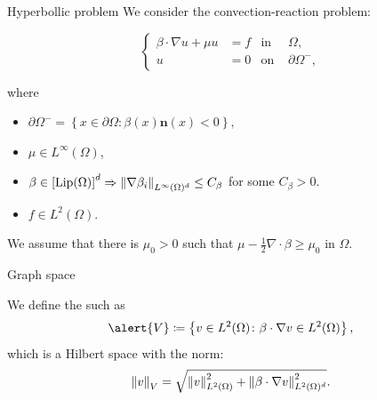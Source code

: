 \begin{frame}{Hyperbollic problem}
	We consider the convection-reaction problem:
	\begin{block}{}
	\begin{equation*}
	\left\{
	\begin{aligned}
	\beta\cdot\nabla u+\mu u&=f & \text{in } &\Omega, \\
	u&=0 & \text{on } &\partial\Omega^-,
	\end{aligned}
	\right.
	\end{equation*}
	\end{block}
	where 
	\begin{itemize}
		\item $\partial\Omega^-=\left\{x\in\partial\Omega\colon \beta(x)\mathbf{n}(x)<0\right\},$
		\item $\mu\in L^\infty(\Omega)$,
		\item $\beta\in\left[\text{Lip}(\Omega)\right]^d \Rightarrow \left\|\nabla\beta_i\right\|_{L^\infty(\Omega)^d}\le C_\beta$ for some $C_\beta >0$.
		\item $f\in L^2(\Omega)$.
	\end{itemize}
	\vspace*{.5cm}
	We assume that there is $\mu_0>0$ such that $\displaystyle\mu-\frac{1}{2}\nabla\cdot\beta\geq\mu_0$ in $\Omega$.
	
	\end{frame}
	
	\begin{frame}{Graph space}
	
	\begin{definicion}
	We define the  such as $$\alert{V}\coloneqq\left\{v\in L^2(\Omega)\colon\beta\cdot\nabla v\in L^2(\Omega) \right\},$$
	which is a Hilbert space with the norm:
	$$
	\left\|v\right\|_V=\sqrt{\left\|v\right\|_{L^2(\Omega)}^2+\left\|\beta\cdot\nabla v\right\|_{L^2(\Omega)^d}^2}.
	$$
	\end{definicion}
	\end{frame}
	
